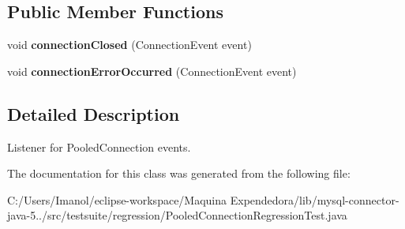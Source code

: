 \subsection*{Public Member Functions}
\begin{DoxyCompactItemize}
\item 
\mbox{\label{classtestsuite_1_1regression_1_1_pooled_connection_regression_test_1_1_connection_listener_ad3a7a8137c8631da7c590cf9ae14d632}} 
void {\bfseries connection\+Closed} (Connection\+Event event)
\item 
\mbox{\label{classtestsuite_1_1regression_1_1_pooled_connection_regression_test_1_1_connection_listener_ad64bb73a2b6c66d5608528771c7f014a}} 
void {\bfseries connection\+Error\+Occurred} (Connection\+Event event)
\end{DoxyCompactItemize}


\subsection{Detailed Description}
Listener for Pooled\+Connection events. 

The documentation for this class was generated from the following file\+:\begin{DoxyCompactItemize}
\item 
C\+:/\+Users/\+Imanol/eclipse-\/workspace/\+Maquina Expendedora/lib/mysql-\/connector-\/java-\/5../src/testsuite/regression/Pooled\+Connection\+Regression\+Test.\+java\end{DoxyCompactItemize}
